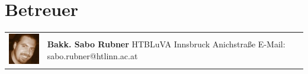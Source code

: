 \section*{Betreuer}

\begin{tabular}[t]{p{2cm} p{7cm}}
    \vspace{0pt}
    \includegraphics[width=2cm]{../images/sabo.jpg}
    &
    \vspace{0pt}
    \textbf{Bakk. Sabo Rubner}
    \newline HTBLuVA Innsbruck Anichstraße
    \newline
    \newline E-Mail: sabo.rubner@htlinn.ac.at
    \\
\end{tabular}

\newpage
